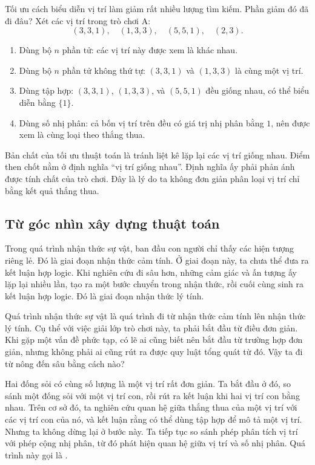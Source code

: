 \documentclass[11pt]{article}
\begin{document}
Tối ưu cách biểu diễn vị trí làm giảm rất nhiều lượng tìm kiếm. Phần giảm đó
đã đi đâu? Xét các vị trí trong trò chơi A:
\[
  (3,3,1),\quad (1,3,3),\quad (5,5,1),\quad (2,3).
\]
\begin{enumerate}
  \item Dùng bộ \(n\) phần tử: các vị trí này được xem là khác nhau.
  \item Dùng bộ \(n\) phần tử không thứ tự: \((3,3,1)\) và \((1,3,3)\) là
  cùng một vị trí.
  \item Dùng tập hợp: \((3,3,1)\), \((1,3,3)\), và \((5,5,1)\) đều giống
  nhau, có thể biểu diễn bằng \(\{1\}\).
  \item Dùng số nhị phân: cả bốn vị trí trên đều có giá trị nhị phân bằng
  \(1\), nên được xem là cùng loại theo thắng thua.
\end{enumerate}

Bản chất của tối ưu thuật toán là tránh liệt kê lặp lại các vị trí giống
nhau. Điểm then chốt nằm ở định nghĩa ``vị trí giống nhau''. Định nghĩa ấy
phải phản ánh được tính chất của trò chơi. Đây là lý do ta không đơn giản
phân loại vị trí chỉ bằng kết quả thắng thua.

\subsection{Từ góc nhìn xây dựng thuật toán}

Trong quá trình nhận thức sự vật, ban đầu con người chỉ thấy các hiện tượng
riêng lẻ. Đó là giai đoạn nhận thức cảm tính. Ở giai đoạn này, ta chưa thể
đưa ra kết luận hợp logic. Khi nghiên cứu đi sâu hơn, những cảm giác và ấn
tượng ấy lặp lại nhiều lần, tạo ra một bước chuyển trong nhận thức, rồi cuối
cùng sinh ra kết luận hợp logic. Đó là giai đoạn nhận thức lý tính.

Quá trình nhận thức sự vật là quá trình đi từ nhận thức cảm tính lên nhận
thức lý tính. Cụ thể với việc giải lớp trò chơi này, ta phải bắt đầu từ điều
đơn giản. Khi gặp một vấn đề phức tạp, có lẽ ai cũng biết nên bắt đầu từ
trường hợp đơn giản, nhưng không phải ai cũng rút ra được quy luật tổng quát
từ đó. Vậy ta đi từ nông đến sâu bằng cách nào?

Hai đống sỏi có cùng số lượng là một vị trí rất đơn giản. Ta bắt đầu ở đó,
so sánh một đống sỏi với một vị trí con, rồi rút ra kết luận khi hai vị trí
con bằng nhau. Trên cơ sở đó, ta nghiên cứu quan hệ giữa thắng thua của một
vị trí với các vị trí con của nó, và kết luận rằng có thể dùng tập hợp để mô
tả một vị trí. Nhưng ta không dừng lại ở bước này. Ta tiếp tục so sánh phép
phân tích vị trí với phép cộng nhị phân, từ đó phát hiện quan hệ giữa vị trí
và số nhị phân. Quá trình này gọi là .
\end{document}

